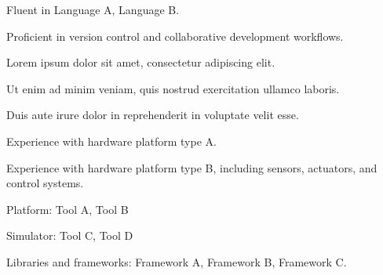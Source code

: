 
\begin{cvitems}
  \item {Fluent in Language A, Language B.}
  \item {Proficient in version control and collaborative development workflows.}
\end{cvitems}

\begin{cvitems}
  \item {Lorem ipsum dolor sit amet, consectetur adipiscing elit.}
  \item {Ut enim ad minim veniam, quis nostrud exercitation ullamco laboris.}
  \item {Duis aute irure dolor in reprehenderit in voluptate velit esse.}
\end{cvitems}

\begin{cvitems}
  \item {Experience with hardware platform type A.}
  \item {Experience with hardware platform type B, including sensors, actuators, and control systems.}
\end{cvitems}

\begin{cvitems}
  \item {Platform: Tool A, Tool B}
  \item {Simulator: Tool C, Tool D}
  \item {Libraries and frameworks: Framework A, Framework B, Framework C.}
\end{cvitems}
